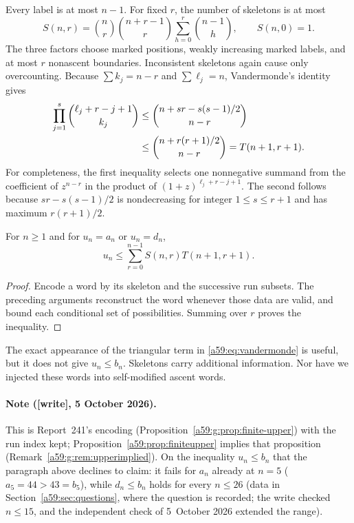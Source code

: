 \documentclass[11pt,letterpaper]{article}
\theoremstyle{remark}\newtheorem{remark}[theorem]{Remark}
\newcommand{\wtag}{\textup{[write]}}
\theoremstyle{remark}\newtheorem{wremark}{Remark}\renewcommand{\thewremark}{W\arabic{wremark}}
\theoremstyle{plain}\newtheorem{wcorollary}[wremark]{Corollary}
\begin{document}
Every label is at most $n-1$. For fixed $r$, the number of skeletons is at most
\begin{equation}\label{a59:eq:skeleton}
 S(n,r)=\binom nr\binom{n+r-1}{r}
          \sum_{h=0}^r\binom{n-1}{h},\qquad S(n,0)=1.
\end{equation}
The three factors choose marked positions, weakly increasing marked labels, and at most $r$ nonascent boundaries. Inconsistent skeletons again cause only overcounting. Because $\sum k_j=n-r$ and $\sum\ell_j=n$, Vandermonde's identity gives
\begin{align}
 \prod_{j=1}^s\binom{\ell_j+r-j+1}{k_j}
 &\le\binom{n+sr-s(s-1)/2}{n-r}\notag\\
 &\le\binom{n+r(r+1)/2}{n-r}
   =T(n+1,r+1).\label{a59:eq:vandermonde}
\end{align}
For completeness, the first inequality selects one nonnegative summand from the coefficient of $z^{n-r}$ in the product of $(1+z)^{\ell_j+r-j+1}$. The second follows because $sr-s(s-1)/2$ is nondecreasing for integer $1\le s\le r+1$ and has maximum $r(r+1)/2$.

\begin{proposition}\label{a59:prop:finiteupper}
For $n\ge1$ and for $u_n=a_n$ or $u_n=d_n$,
\begin{equation}\label{a59:eq:finiteupper}
 u_n\le\sum_{r=0}^{n-1}S(n,r)T(n+1,r+1).
\end{equation}
\end{proposition}
\begin{proof}
Encode a word by its skeleton and the successive run subsets. The preceding arguments reconstruct the word whenever those data are valid, and bound each conditional set of possibilities. Summing over $r$ proves the inequality.
\end{proof}
The exact appearance of the triangular term in \eqref{a59:eq:vandermonde} is useful, but it does not give $u_n\le b_n$. Skeletons carry additional information. Nor have we injected these words into self-modified ascent words.

\paragraph{Note (\wtag, 5 October 2026).} This is Report~241's encoding
(Proposition~\ref{a59:g:prop:finite-upper}) with the run index kept;
Proposition~\ref{a59:prop:finiteupper} implies that proposition
(Remark~\ref{a59:g:rem:upperimplied}). On the inequality $u_n\le b_n$ that
the paragraph above declines to claim: it fails for $a_n$ already at $n=5$
($a_5=44>43=b_5$), while $d_n\le b_n$ holds for every $n\le26$ (data in
Section~\ref{a59:sec:questions}, where the question is recorded; the write
checked $n\le15$, and the independent check of 5~October 2026 extended the
range).
\end{document}
